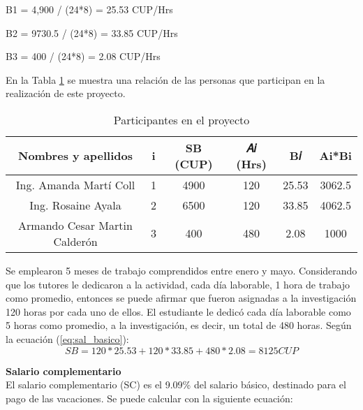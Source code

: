 B1 = 4,900 / (24*8) = 25.53 CUP/Hrs

B2 = 9730.5 / (24*8) = 33.85 CUP/Hrs

B3 = 400 / (24*8) = 2.08 CUP/Hrs

En la Tabla \ref{table:participantes_proyecto} se muestra una relación de las personas que participan en la realización de este proyecto. \\


\begin{table}[H]
    \caption{Participantes en el proyecto}
    \label{table:participantes_proyecto}

    \begin{tabular}{|c|c|c|c|c|c|}
        \hline
        \textbf{Nombres y apellidos}  & \textbf{i} & \textbf{SB (CUP)} & \textbf{𝐴𝑖 (Hrs)} & \textbf{B𝑖 } & \textbf{Ai*Bi} \\
        \hline
        Ing. Amanda Martí Coll        & 1          & 4900              & 120               & 25.53        & 3062.5
        \\
        \hline
        Ing. Rosaine Ayala            & 2          & 6500              & 120               & 33.85        & 4062.5
        \\
        \hline
        Armando Cesar Martin Calderón & 3          & 400               & 480               & 2.08         & 1000
        \\

        \hline
    \end{tabular}
\end{table}


Se emplearon 5 meses de trabajo comprendidos entre enero y mayo. Considerando que los tutores le dedicaron a la actividad, cada día laborable, 1 hora de trabajo como promedio, entonces se puede afirmar que fueron asignadas a la investigación 120 horas por cada uno de ellos.
El estudiante le dedicó cada día laborable como 5 horas como promedio, a la investigación, es decir, un total de 480 horas.
Según la ecuación (\ref{eq:sal_basico}):\\

\begin{equation}
    \label{eq:salary_basico_total}
    SB = 120 * 25.53 + 120 * 33.85 + 480 * 2.08 = 8125 CUP
\end{equation}


\textbf{Salario complementario}\\
El salario complementario (SC) es el 9.09\% del salario básico, destinado para el pago de las
vacaciones. Se puede calcular con la siguiente ecuación:

